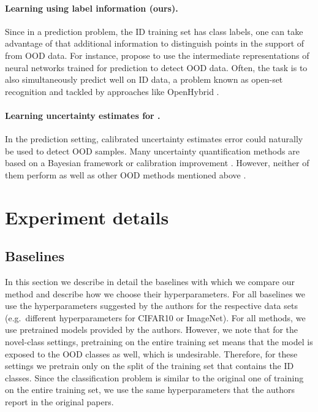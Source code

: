 \paragraph{Learning  using label information (ours).} Since in a
prediction problem, the ID training set has class labels, one can take advantage
of that additional information to distinguish points in the support of 
from OOD data. For instance, \citet{mahalanobis, gram_ood} propose to use the
intermediate representations of neural networks trained for prediction to detect
OOD data. Often, the task is to also simultaneously predict well on ID data, a
problem known as open-set recognition \citep{Geng2021} and
tackled by approaches like OpenHybrid \citep{openhybrid2020}.

\paragraph{Learning uncertainty estimates for .} In the prediction
setting, calibrated uncertainty estimates error could naturally be used to
detect OOD samples. Many uncertainty quantification methods are based on a
Bayesian framework \citep{gal2016, dpn} or calibration
improvement \citep{odin, Hafner2019}. However, neither of them perform as well
as other OOD methods mentioned above \citep{ood_ovadia}.




\section{Experiment details}
\label{sec:appendix_experiments}

\subsection{Baselines}

In this section we describe in detail the baselines with which we compare our
method and describe how we choose their hyperparameters. For all baselines we
use the hyperparameters suggested by the authors for the respective data sets
(e.g.\ different hyperparameters for CIFAR10 or ImageNet). For all methods, we
use pretrained models provided by the authors. However, we note that for the
novel-class settings, pretraining on the entire training set means that the
model is exposed to the OOD classes as well, which is undesirable. Therefore,
for these settings we pretrain only on the split of the training set that
contains the ID classes. Since the classification problem is similar to the
original one of training on the entire training set, we use the same
hyperparameters that the authors report in the original papers.

